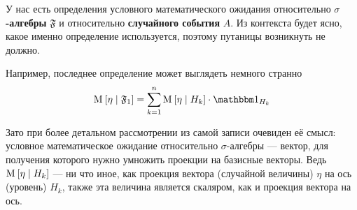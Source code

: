 \begin{remark}
    У нас есть определения условного математического ожидания
    относительно \textbf{$\sigma$-алгебры} $\mathfrak{F}$
    и относительно \textbf{случайного события} $A$.
    Из контекста будет ясно, какое именно определение используется,
    поэтому путаницы возникнуть не должно.

    Например, последнее определение может выглядеть немного странно
    $$\Mean{ \eta \mid \mathfrak{F}_1 }
        = \sum_{k=1}^n \Mean{ \eta \mid H_k }
            \cdot \indicatorof{H_k}$$

    Зато при более детальном рассмотрении из самой записи очевиден её смысл:
    условное математическое ожидание относительно $\sigma$-алгебры --- вектор,
    для получения которого нужно умножить проекции на базисные векторы.
    Ведь $\mathrm{M}_{} \left[  \eta \mid H_k  \right]$ --- ни что иное, как проекция
    вектора (случайной величины) $\eta$ на ось (уровень) $H_k$,
    также эта величина является скаляром, как и проекция вектора на ось.
\end{remark}

